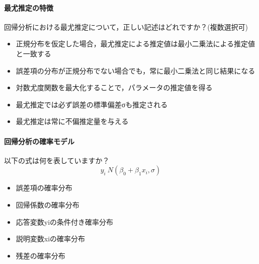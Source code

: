 \documentclass{ltjbook}
\begin{document}
\paragraph{最尤推定の特徴}回帰分析における最尤推定について，正しい記述はどれですか？(複数選択可)
\begin{itemize}
	\item 正規分布を仮定した場合，最尤推定による推定値は最小二乗法による推定値と一致する
	\item 誤差項の分布が正規分布でない場合でも，常に最小二乗法と同じ結果になる
	\item 対数尤度関数を最大化することで，パラメータの推定値を得る
	\item 最尤推定では必ず誤差の標準偏差σも推定される
	\item 最尤推定は常に不偏推定量を与える
\end{itemize}

\paragraph{回帰分析の確率モデル}以下の式は何を表していますか？
$$ y_i ~ N(\beta_0 +\beta_1x_i, \sigma) $$
\begin{itemize}
	\item 誤差項の確率分布
	\item 回帰係数の確率分布
	\item 応答変数yiの条件付き確率分布
	\item 説明変数xiの確率分布
	\item 残差の確率分布
\end{itemize}
\end{document}
